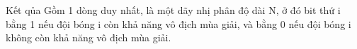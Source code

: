 Kết qủa
Gồm 1 dòng duy nhất, là một dãy nhị phân độ dài N, ở đó bit thứ i bằng 1 nếu đội bóng i còn khả năng vô địch mùa giải, và bằng 0 nếu đội bóng i không còn khả năng vô địch mùa giải.